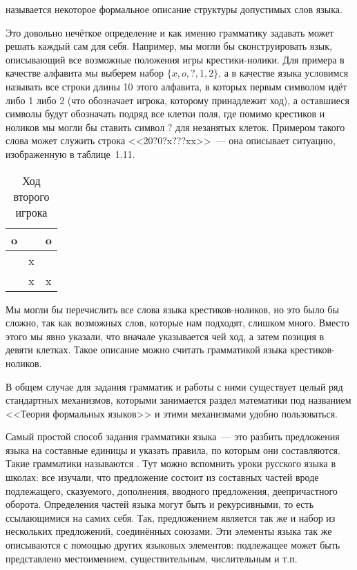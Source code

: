 \begin{definition}
 называется некоторое формальное описание структуры допустимых слов языка.
\end{definition}

Это довольно нечёткое определение и как именно грамматику задавать может решать каждый сам для себя. Например, мы могли бы сконструировать язык, описывающий все возможные положения игры крестики-нолики. Для примера в качестве алфавита мы выберем набор $\{x, o, ?,1, 2\}$, а в качестве языка условимся называть все строки длины 10 этого алфавита, в которых первым символом идёт либо 1 либо 2 (что обозначает игрока, которому принадлежит ход), а оставшиеся символы будут обозначать подряд все клетки поля, где помимо крестиков и ноликов мы могли бы ставить символ $?$ для незанятых клеток. Примером такого слова может служить строка <<20?0?x???xx>>~--- она описывает ситуацию, изображенную в таблице~1.11.

\begin{table}[h]
\centering
\begin{tabular}{c | c | c}
o & & o\\
\hline
  & x & \\
\hline
 & x & x
\end{tabular}
\caption{Ход второго игрока}
\end{table}

Мы могли бы перечислить все слова языка крестиков-ноликов, но это было бы сложно, так как возможных слов, которые нам подходят, слишком много. Вместо этого мы явно указали, что вначале указывается чей ход, а затем позиция в девяти клетках. Такое описание можно считать грамматикой языка крестиков-ноликов.

В общем случае для задания грамматик и работы с ними существует целый ряд стандартных механизмов, которыми занимается раздел математики под названием <<Теория формальных языков>> и этими механизмами удобно пользоваться.

Самый простой способ задания грамматики языка~--- это разбить предложения языка на составные единицы и указать правила, по которым они составляются. Такие грамматики называются . Тут можно вспомнить уроки русского языка в школах: все изучали, что предложение состоит из составных частей вроде подлежащего, сказуемого, дополнения, вводного предложения, деепричастного оборота. Определения частей языка могут быть и рекурсивными, то есть ссылающимися на самих себя. Так, предложением является так же и набор из нескольких предложений, соединённых союзами. Эти элементы языка так же описываются с помощью других языковых элементов: подлежащее может быть представлено местоимением, существительным, числительным и т.п.

